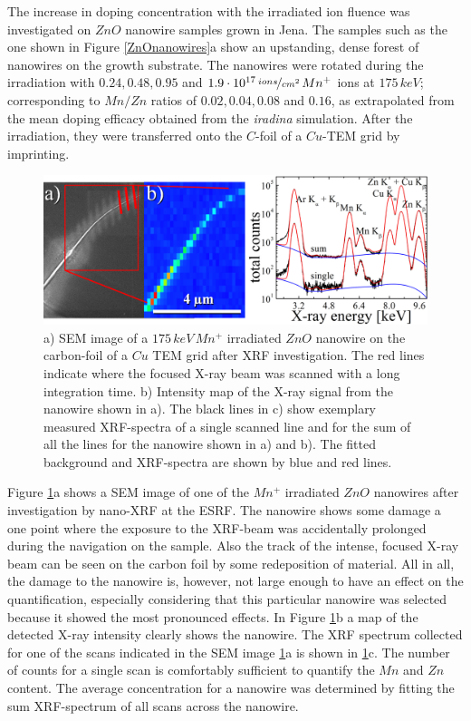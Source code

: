 The increase in doping concentration with the irradiated ion fluence was investigated on $ZnO$ nanowire samples grown in Jena. The samples such as the one shown in Figure \ref{ZnOnanowires}a show an upstanding, dense forest of nanowires on the growth substrate. The nanowires were rotated during the irradiation with $0.24, 0.48, 0.95$ and $1.9\cdot 10^{17}\,\nicefrac{ions}{cm^2}\,Mn^+$ ions at $175\,keV$; corresponding to $Mn/Zn$ ratios of $0.02, 0.04, 0.08$ and $0.16$, as extrapolated from the mean doping efficacy obtained from the \emph{iradina} simulation. After the irradiation, they were transferred onto the $C$-foil of a $Cu$-TEM grid by imprinting.

\begin{figure}[h]
	\centering
		\includegraphics[width=.8\textwidth]{images/XRFSEM.png}
	\caption{a) SEM image of a $175\,keV\,Mn^+$ irradiated $ZnO$ nanowire on the carbon-foil of a $Cu$ TEM grid after XRF investigation. The red lines indicate where the focused X-ray beam was scanned with a long integration time. b) Intensity map of the X-ray signal from the nanowire shown in a). The black lines in c) show exemplary measured XRF-spectra of a single scanned line and for the sum of all the lines for the nanowire shown in a) and b). The fitted background and XRF-spectra are shown by blue and red lines.} 
	\label{XRFSEM}
\end{figure} 


Figure \ref{XRFSEM}a shows a SEM image of one of the $Mn^+$ irradiated $ZnO$ nanowires after investigation by nano-XRF at the ESRF. The nanowire shows some damage a one point where the exposure to the XRF-beam was accidentally prolonged during the navigation on the sample. Also the track of the intense, focused X-ray beam can be seen on the carbon foil by some redeposition of material. All in all, the damage to the nanowire is, however, not large enough to have an effect on the quantification, especially considering that this particular nanowire was selected because it showed the most pronounced effects. In Figure \ref{XRFSEM}b a map of the detected X-ray intensity clearly shows the nanowire. The XRF spectrum collected for one of the scans indicated in the SEM image \ref{XRFSEM}a is shown in \ref{XRFSEM}c. The number of counts for a single scan is comfortably sufficient to quantify the $Mn$ and $Zn$ content. The average concentration for a nanowire was determined by fitting the sum XRF-spectrum of all scans across the nanowire.

